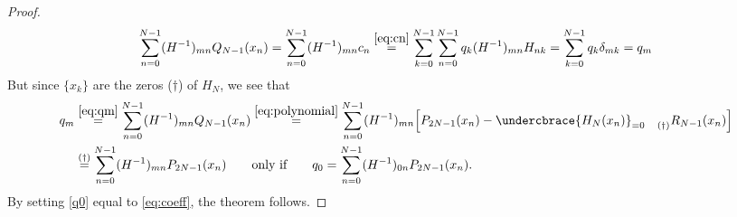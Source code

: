 \documentclass[11pt,english,a4paper]{article}
\begin{document}
\begin{proof}
\begin{equation}
\sum_{n=0}^{N-1}(H^{-1})_{mn}Q_{N-1}(x_n) = \sum_{n=0}^{N-1}(H^{-1})_{mn} c_n \stackrel{\eqref{eq:cn}}{=} \sum_{k=0}^{N-1}\sum_{n=0}^{N-1}q_k(H^{-1})_{mn} H_{nk} = \sum_{k=0}^{N-1}q_k \delta_{mk} = q_{m} \label{eq:qm}
\end{equation}
But since $\{x_k\}$ are the zeros ($\dagger$) of $H_N$, we see that
\begin{align}
q_m &\stackrel{\eqref{eq:qm}}{=} \sum_{n=0}^{N-1}(H^{-1})_{mn}Q_{N-1}(x_n) \stackrel{\eqref{eq:polynomial}}{=} \sum_{n=0}^{N-1}(H^{-1})_{mn}\Big[ P_{2N-1}(x_n) - \undercbrace{H_N(x_n)}_{=0 \quad (\dagger) } R_{N-1} (x_n) \Big] \nonumber\\
& \stackrel{(\dagger)}{=} \sum_{n=0}^{N-1}(H^{-1})_{mn}P_{2N-1}(x_n) \qquad \text{only if}\qquad q_0 = \sum_{n=0}^{N-1}(H^{-1})_{0n}P_{2N-1}(x_n). \label{q0}
\end{align}
By setting \eqref{q0} equal to \eqref{eq:coeff}, the theorem follows.
\end{proof}

\printbibliography
\end{document}
